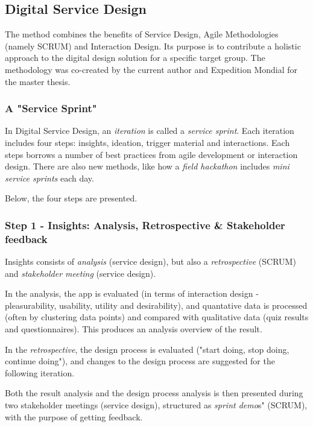 \subsection{Digital Service Design} \label{digital-service-design}

The method combines the benefits of Service Design, Agile Methodologies (namely SCRUM) and Interaction Design. Its purpose is to contribute a holistic approach to the digital design solution for a specific target group. The methodology was co-created by the current author and Expedition Mondial for the master thesis. \citep{nissar}

\subsubsection{A "Service Sprint"}
In Digital Service Design, an \textit{iteration} is called a \textit{service sprint}. Each iteration includes four steps: insights, ideation, trigger material and interactions. Each steps borrows a number of best practices from agile development or interaction design. There are also new methods, like how a \textit{field hackathon} includes \textit{mini service sprints} each day.

Below, the four steps are presented.

\subsubsection{Step 1 - Insights: Analysis, Retrospective \& Stakeholder feedback}
  Insights consists of \textit{analysis} (service design), but also a \textit{retrospective} (SCRUM) and \textit{stakeholder meeting} (service design).

    In the analysis, the app is evaluated (in terms of interaction design - pleasurability, usability, utility and desirability), and quantative data is processed (often by clustering data points) and compared with qualitative data (quiz results and questionnaires). This produces an analysis overview of the result.

    In the \textit{retrospective}, the design process is evaluated ("start doing, stop doing, continue doing"), and changes to the design process are suggested for the following iteration.

    Both the result analysis and the design process analysis is then presented during two stakeholder meetings (service design), structured as \textit{sprint demo}s" (SCRUM), with the purpose of getting feedback.

